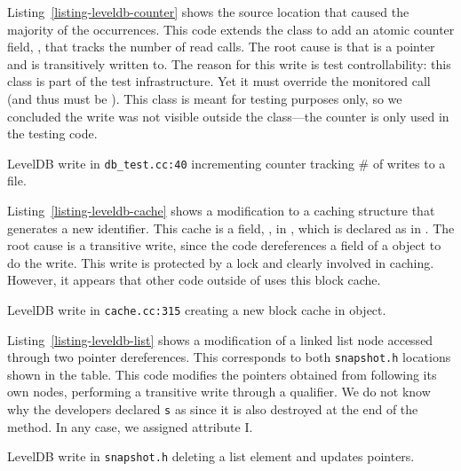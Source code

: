 Listing~\ref{listing-leveldb-counter} shows the source location that caused
the majority of the occurrences.
This code extends the  class to add an atomic counter
field, , that tracks the number of read calls.
The root cause is that  is a pointer and is transitively written
to.
The reason for this write is test controllability: this class is part of the
test infrastructure.
Yet it must override the monitored call (and thus must be \const{}).
This class is meant for testing purposes only, so we concluded the write was not
visible outside the class---the counter is only used in the testing code.

\begin{listing}[!htb]
  \caption{LevelDB write in \texttt{db\_test.cc:40} incrementing counter tracking
           \# of writes to a file.}
  \label{listing-leveldb-counter}
  \centering
  
\end{listing}

Listing~\ref{listing-leveldb-cache} shows a modification to a caching structure
that generates a new identifier.
This cache is a field, , in , which is declared
as  in .
The root cause is a transitive write, since the code dereferences a field of a
\const{} object to do the write.
This write is protected by a lock and clearly involved in caching.
However, it appears that other code outside of  uses this block
cache.

\begin{listing}[!htb]
  \caption{LevelDB write in \texttt{cache.cc:315} creating a new block cache in
            object.}
  \label{listing-leveldb-cache}
  \centering
  
\end{listing}

Listing~\ref{listing-leveldb-list} shows a modification of a linked list node
accessed through two pointer dereferences.
This corresponds to both \texttt{snapshot.h} locations shown in the table.
This code modifies the pointers obtained from following its own nodes,
performing a transitive write through a \const{} qualifier.
We do not know why the developers declared \texttt{s} as \const{} since it is
also destroyed at the end of the method. In any case, we assigned attribute I.

\begin{listing}[!htb]
  \caption{LevelDB write in \texttt{snapshot.h} deleting a list element and
           updates pointers.}
  \label{listing-leveldb-list}
  \centering
  
\end{listing}

